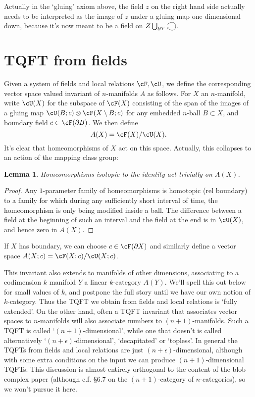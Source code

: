 \documentclass[11pt]{amsart}
\theoremstyle{plain}
\newtheorem{lem}[prop]{Lemma}
\newcommand{\selfarrow}{\ensuremath{\smash{\tikz[baseline]{\clip (0,0.36) rectangle (0.48,-0.16); \draw[->] (0,0.175) .. controls (0.6,0.65) and (0.6,-0.45) .. (0,0.025);}}}}
\newcommand{\bdy}{\partial}
\newcommand{\tensor}{\otimes}
\begin{document}
Actually in the `gluing' axiom above, the field $z$ on the right hand side actually needs to be interpreted as the image of $z$ under a gluing map one dimensional down, because it's now meant to be a field on $Z \bigcup_{\bdy Y} \selfarrow$.

\section{TQFT from fields}
Given a system of fields and local relations $\cF, \cU$, we define the corresponding vector space valued invariant of $n$-manifolds $A$ as follows. For $X$ an $n$-manifold, write $\cU(X)$ for the subspace of $\cF(X)$ consisting of the span of the images of a gluing map $\cU(B; c) \tensor \cF(X \setminus B; c)$ for any embedded $n$-ball $B \subset X$, and boundary field $c \in \cF(\bdy B)$. We then define
$$A(X) = \cF(X) / \cU(X).$$
It's clear that homeomorphisms of $X$ act on this space. Actually, this collapses to an action of the mapping class group:
\begin{lem}
Homeomorphisms isotopic to the identity act trivially on $A(X)$.
\end{lem}
\begin{proof}
Any $1$-parameter family of homeomorphisms is homotopic (rel boundary) to a family for which during any sufficiently short interval of time, the homeomorphism is only being modified inside a ball. The difference between a field at the beginning of such an interval and the field at the end is in $\cU(X)$, and hence zero in $A(X)$.
\end{proof}


If $X$ has boundary, we can choose $c \in \cF(\bdy X)$ and similarly define a vector space $A(X; c) = \cF(X; c) / \cU(X; c)$.

This invariant also extends to manifolds of other dimensions, associating to a codimension $k$ manifold $Y$ a linear $k$-category $A(Y)$. We'll spell this out below for small values of $k$, and postpone the full story until we have our own notion of $k$-category. Thus the TQFT we obtain from fields and local relations is `fully extended'. On the other hand, often a TQFT invariant that associates vector spaces to $n$-manifolds will also associate numbers to $(n+1)$-manifolds.  Such a TQFT is called `$(n+1)$-dimensional', while one that doesn't is called alternatively `$(n+\epsilon)$-dimensional', `decapitated' or `topless'. In general the TQFTs from fields and local relations are just $(n+\epsilon)$-dimensional, although with some extra conditions on the input we can produce $(n+1)$-dimensional TQFTs. This discussion is almost entirely orthogonal to the content of the blob complex paper (although c.f. \S 6.7 on the $(n+1)$-category of $n$-categories), so we won't pursue it here.
\end{document}
